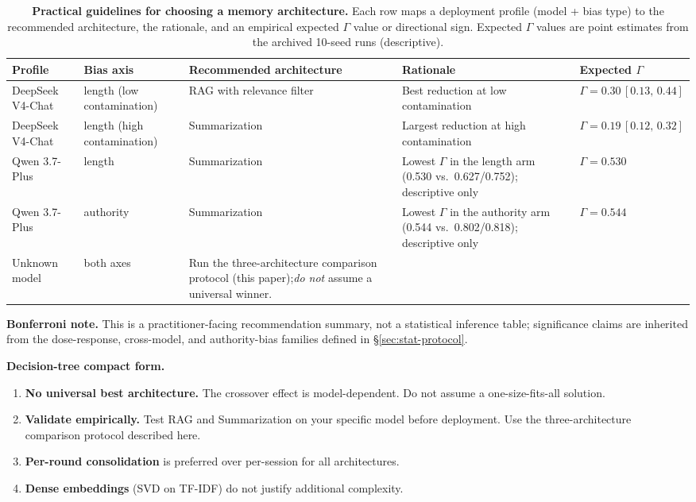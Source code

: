 \documentclass[11pt]{article}
\begin{document}
\begin{table}[t]
\centering
\caption{\textbf{Practical guidelines for choosing a memory architecture.} Each row maps a deployment profile (model + bias type) to the recommended architecture, the rationale, and an empirical expected $\Gamma$ value or directional sign. Expected $\Gamma$ values are point estimates from the archived 10-seed runs (descriptive).}
\label{tab:guidelines}
\small
\begin{tabular}{@{}p{2.4cm}p{2.2cm}p{3.1cm}p{3.3cm}p{2.4cm}@{}}
\toprule
\textbf{Profile} & \textbf{Bias axis} & \textbf{Recommended architecture} & \textbf{Rationale} & \textbf{Expected $\Gamma$} \\
\midrule
DeepSeek V4-Chat & length (low contamination)  & RAG with relevance filter & Best reduction at low contamination       & $\Gamma = 0.30\,[0.13,\,0.44]$ \\
DeepSeek V4-Chat & length (high contamination) & Summarization              & Largest reduction at high contamination   & $\Gamma = 0.19\,[0.12,\,0.32]$ \\
Qwen 3.7-Plus     & length                       & Summarization                & Lowest $\Gamma$ in the length arm (0.530 vs.\ 0.627/0.752); descriptive only & $\Gamma = 0.530$ \\
Qwen 3.7-Plus     & authority                    & Summarization                & Lowest $\Gamma$ in the authority arm (0.544 vs.\ 0.802/0.818); descriptive only & $\Gamma = 0.544$ \\
Unknown model     & both axes                    & Run the three-architecture comparison protocol (this paper);\emph{do not} assume a universal winner. & & \\
\bottomrule
\end{tabular}
\par\smallskip
{\small\textbf{Bonferroni note.} This is a practitioner-facing recommendation summary, not a statistical inference table; significance claims are inherited from the dose-response, cross-model, and authority-bias families defined in \S\ref{sec:stat-protocol}.}
\end{table}

\noindent\textbf{Decision-tree compact form.}
\begin{enumerate}[nosep]
    \item \textbf{No universal best architecture.} The crossover effect is model-dependent. Do not assume a one-size-fits-all solution.
    \item \textbf{Validate empirically.} Test RAG and Summarization on your specific model before deployment. Use the three-architecture comparison protocol described here.
    \item \textbf{Per-round consolidation} is preferred over per-session for all architectures.
    \item \textbf{Dense embeddings} (SVD on TF-IDF) do not justify additional complexity.
\end{enumerate}
\end{document}
